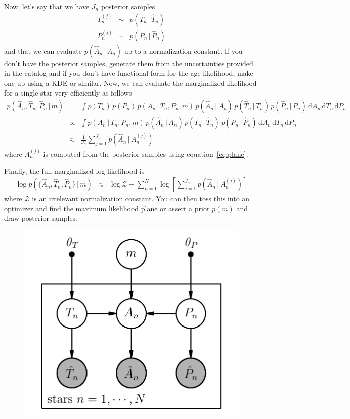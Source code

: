 \documentclass[12pt,preprint]{aastex}
\newcommand{\dd}{\ensuremath{\,\mathrm{d}}}
\begin{document}
Now, let's say that we have $J_n$ posterior samples
\begin{eqnarray}
T_n^{(j)} &\sim& p(T_n\,|\,\hat{T}_n) \nonumber \\
P_n^{(j)} &\sim& p(P_n\,|\,\hat{P}_n)
\end{eqnarray}
and that we can evaluate $p(\hat{A}_n\,|\,A_n)$ up to a normalization constant.
If you don't have the posterior samples, generate them from the uncertainties
provided in the catalog and if you don't have functional form for the age
likelihood, make one up using a KDE or similar.
Now, we can evaluate the marginalized likelihood for a single star very
efficiently as follows
\begin{eqnarray}
p(\hat{A}_n,\hat{T}_n,\hat{P}_n\,|\,m) &=&
\int
    p(T_n)\,p(P_n)\,p(A_n\,|\,T_n,P_n,m)\,
    p(\hat{A}_n\,|\,A_n)\,p(\hat{T}_n\,|\,T_n)\,p(\hat{P}_n\,|\,P_n)
    \dd A_n \dd T_n \dd P_n \nonumber\\
&\propto& \int
    p(A_n\,|\,T_n,P_n,m)\,p(\hat{A}_n\,|\,A_n)\,
    p(T_n\,|\,\hat{T}_n)\,p(P_n\,|\,\hat{P}_n)
    \dd A_n \dd T_n \dd P_n \nonumber\\
&\approx& \frac{1}{J_n} \sum_{j=1}^{J_n}p(\hat{A}_n\,|\,A_n^{(j)})
\end{eqnarray}
where $A_n^{(j)}$ is computed from the posterior samples using
equation~\ref{eq:plane}.

Finally, the full marginalized log-likelihood is
\begin{eqnarray}
\log p(\{\hat{A}_n,\hat{T}_n,\hat{P}_n\}\,|\,m) &\approx&
    \log\mathcal{Z} + \sum_{n=1}^N
        \log \left[ \sum_{j=1}^{J_n}p(\hat{A}_n\,|\,A_n^{(j)}) \right ]
\end{eqnarray}
where $\mathcal{Z}$ is an irrelevant normalization constant.
You can then toss this into an optimizer and find the maximum likelihood plane
or assert a prior $p(m)$ and draw posterior samples.

\begin{figure}[htbp]
\begin{center}
    \includegraphics{pgm.pdf}
\end{center}
\caption{%
\label{fig:gm}}
\end{figure}
\end{document}
